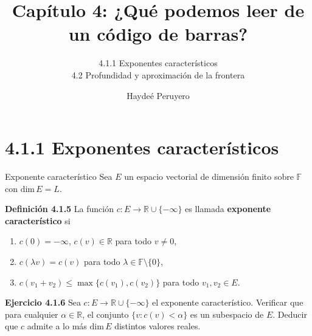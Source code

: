 \documentclass{beamer}
\title{Capítulo 4: ¿Qué podemos leer de un código de barras?}
\subtitle{4.1.1 Exponentes característicos \\ 4.2 Profundidad y aproximación de la frontera} %
\author{Haydeé Peruyero}
\newcounter{Ejercicio}
\newcommand{\setm}{\setminus}
\def\R{\mathbb{R}}
\def\F {\mathbb{F}}
\def \dim{{\mbox {dim}}\,}
\begin{document}
\frenchspacing


  \frame{\maketitle}


%

\section{4.1.1 Exponentes característicos}

\begin{frame}{Exponente característico}
Sea $E$ un espacio vectorial de dimensión finito sobre $\F$ con $\dim E = L$. \\[0.3cm]\pause

\textbf{{\color{cyan}Definición 4.1.5}}
La función $c: E \to \R \cup \{-\infty\}$ es llamada \textbf{{\color{green}exponente característico}} si \pause
	\begin{enumerate}
		\item
			$c(0) = -\infty$, $c(v)\in \R$ para todo $v\neq 0$, \pause
		\item
			$c(\lambda v) = c (v)$ para todo $\lambda \in \F \setm \{0\}$, \pause
		\item
			$c(v_1 + v_2) \leq \max \{ c(v_1), c(v_2) \}$ para todo $v_1, v_2 \in E$.\\[0.5cm]
	\end{enumerate} \pause

\textbf{{\color{violet}Ejercicio 4.1.6}}
Sea $c:E \to \R \cup \{-\infty\}$ el exponente característico. Verificar que para cualquier $\alpha \in \R$, el conjunto $\{ v : c(v) < \alpha \}$ es un subespacio de $E$. Deducir que $c$ admite a lo más $\dim E$ distintos valores reales.

\end{frame}
\end{document}
